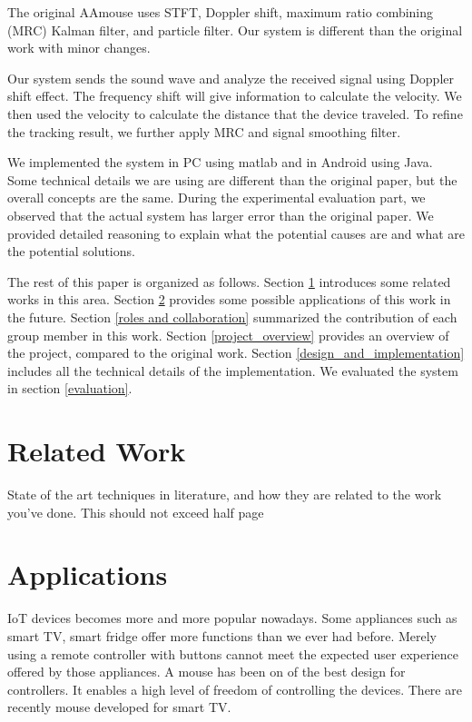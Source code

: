 \documentclass{acm_proc_article-sp}
\begin{document}
The original AAmouse uses STFT, Doppler shift, maximum ratio 
combining (MRC) Kalman filter, and 
particle filter. Our system is different than the original work with
minor changes. 

Our system sends the sound wave and analyze the received signal using
Doppler shift effect. The frequency shift will give information to 
calculate the velocity. We then used the velocity to calculate the
distance that the device traveled. To refine the tracking result,
we further apply MRC and signal smoothing
filter. 

We implemented the system in PC using matlab and in Android using
Java. Some technical details we are using are different than the 
original paper, but the overall concepts are the same. During the 
experimental evaluation part, we observed that the actual system has
larger error than the original paper.
We provided detailed
reasoning to explain what the potential causes are and what are the
potential solutions.

The rest of this paper is organized as follows. Section
\ref{related_work} introduces some related works in this area.
Section \ref{applications} provides some possible applications of
this work in the future. Section \ref{roles and collaboration}
summarized the contribution of each group member in this work. 
Section \ref{project_overview} provides an overview of the project,
compared to the original work. Section \ref{design_and_implementation}
includes all the technical details of the implementation. We evaluated
the system in section \ref{evaluation}.

\section{Related Work} \label{related_work}
State of the art techniques in literature, and how they are
related to the work you’ve done.  This should not exceed half
page

\section{Applications} \label{applications}
IoT devices becomes more and more popular nowadays. Some appliances
such as smart TV, smart fridge offer more functions than we ever
had before. Merely using a remote controller with buttons cannot meet
the expected user experience offered by those appliances. A mouse has
been on of the best design for controllers. It enables a high level of 
freedom of controlling the devices. There are recently mouse developed
for smart TV. 
\end{document}
